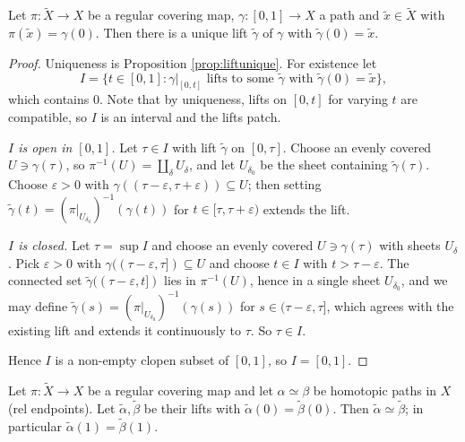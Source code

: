 \begin{proposition}\label{prop:pathlifting}
	Let $\pi : \tilde X \to X$ be a regular covering map, $\gamma : [0,1] \to X$ a path
	and $\tilde x \in \tilde X$ with $\pi(\tilde x) = \gamma(0)$. Then there is a unique
	lift $\tilde\gamma$ of $\gamma$ with $\tilde\gamma(0) = \tilde x$.
\end{proposition}

\begin{proof}
	Uniqueness is Proposition \ref{prop:liftunique}. For existence let
	$$
	I = \{ t \in [0,1] : \gamma|_{[0,t]} \text{ lifts to some } \tilde\gamma \text{ with } \tilde\gamma(0) = \tilde x\},
	$$
	which contains $0$. Note that by uniqueness, lifts on $[0,t]$ for varying $t$ are
	compatible, so $I$ is an interval and the lifts patch.

	\emph{$I$ is open in $[0,1]$.} Let $\tau \in I$ with lift $\tilde\gamma$ on $[0,\tau]$.
	Choose an evenly covered $U \ni \gamma(\tau)$, so $\pi^{-1}(U) = \coprod_\delta U_\delta$,
	and let $U_{\delta_0}$ be the sheet containing $\tilde\gamma(\tau)$. Choose
	$\varepsilon > 0$ with $\gamma((\tau - \varepsilon, \tau+\varepsilon)) \subseteq U$;
	then setting $\tilde\gamma(t) = (\pi|_{U_{\delta_0}})^{-1}(\gamma(t))$ for
	$t \in [\tau, \tau + \varepsilon)$ extends the lift.

	\emph{$I$ is closed.} Let $\tau = \sup I$ and choose an evenly covered $U \ni \gamma(\tau)$
	with sheets $U_\delta$. Pick $\varepsilon > 0$ with
	$\gamma((\tau-\varepsilon,\tau]) \subseteq U$ and choose $t \in I$ with
	$t > \tau - \varepsilon$. The connected set $\tilde\gamma((\tau - \varepsilon, t])$ lies
	in $\pi^{-1}(U)$, hence in a single sheet $U_{\delta_0}$, and we may define
	$\tilde\gamma(s) = (\pi|_{U_{\delta_0}})^{-1}(\gamma(s))$ for
	$s \in (\tau - \varepsilon, \tau]$, which agrees with the existing lift and extends it
	continuously to $\tau$. So $\tau \in I$.

	Hence $I$ is a non-empty clopen subset of $[0,1]$, so $I = [0,1]$.
\end{proof}

\begin{theorem}\label{thm:homotopylifting}
	Let $\pi : \tilde X \to X$ be a regular covering map and let $\alpha \simeq \beta$ be
	homotopic paths in $X$ (rel endpoints). Let $\tilde\alpha, \tilde\beta$ be their lifts
	with $\tilde\alpha(0) = \tilde\beta(0)$. Then $\tilde\alpha \simeq \tilde\beta$; in
	particular $\tilde\alpha(1) = \tilde\beta(1)$.
\end{theorem}

